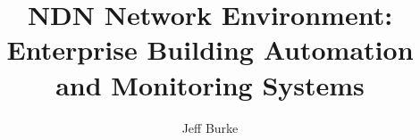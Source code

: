 \documentclass[10pt,onecolumn]{IEEEtran}
\begin{document}
\title{NDN Network Environment: Enterprise Building Automation and Monitoring Systems}
\author{Jeff Burke}

\maketitle



















\newpage


\end{document}

